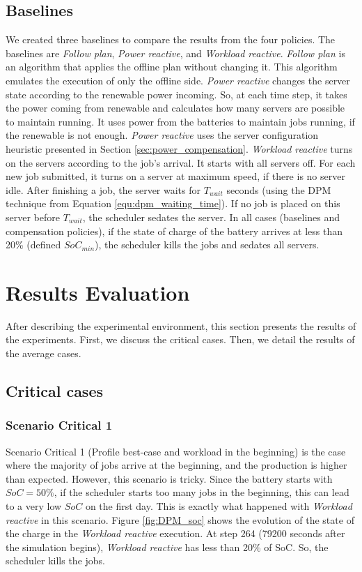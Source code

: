 \subsection{Baselines}
We created three baselines to compare the results from the four policies. The baselines are \emph{Follow plan}, \emph{Power reactive}, and \emph{Workload reactive}. \emph{Follow plan} is an algorithm that applies the offline plan without changing it. This algorithm emulates the execution of only the offline side. \emph{Power reactive} changes the server state according to the renewable power incoming. So, at each time step, it takes the power coming from renewable and calculates how many servers are possible to maintain running. It uses power from the batteries to maintain jobs running, if the renewable is not enough. \emph{Power reactive} uses the server configuration heuristic presented in Section \ref{sec:power_compensation}. \emph{Workload reactive} turns on the servers according to the job's arrival. It starts with all servers off. For each new job submitted, it turns on a server at maximum speed, if there is no server idle. After finishing a job, the server waits for $T_{wait}$ seconds (using the DPM technique from Equation \ref{equ:dpm_waiting_time}). If no job is placed on this server before $T_{wait}$, the scheduler sedates the server. In all cases (baselines and compensation policies), if the state of charge of the battery arrives at less than 20\% (defined $SoC_{min}$), the scheduler kills the jobs and sedates all servers. 

\section{Results Evaluation}

After describing the experimental environment, this section presents the results of the experiments. First, we discuss the critical cases. Then, we detail the results of the average cases.

\subsection{Critical cases}

\subsubsection{Scenario Critical 1}
Scenario Critical 1 (Profile best-case and workload in the beginning) is the case where the majority of jobs arrive at the beginning, and the production is higher than expected. However, this scenario is tricky. Since the battery starts with $SoC = 50\%$, if the scheduler starts too many jobs in the beginning, this can lead to a very low $SoC$ on the first day. This is exactly what happened with \emph{Workload reactive} in this scenario. Figure \ref{fig:DPM_soc} shows the evolution of the state of the charge in the \emph{Workload reactive} execution. At step 264 (79200 seconds after the simulation begins), \emph{Workload reactive} has less than 20\% of SoC. So, the scheduler kills the jobs. 

